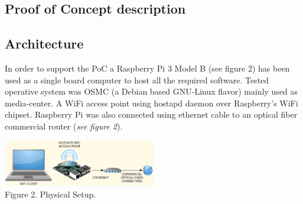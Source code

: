 \documentclass[12pt]{amsart}
\begin{document}
\begin{multicols}{2}

\section{Proof of Concept description}

\subsection{Architecture}
\label{ch:architecture}
\vspace{0.35cm}

In order to support the PoC a
Raspberry Pi 3 Model B (see figure 2) has been used
as a single board computer to host all the required software.
Tested operative system was OSMC\cite{osmc} (a Debian based
GNU-Linux flavor) mainly used as media-center.
A WiFi access point using
hostapd\cite{hostapd} daemon over Raspberry's WiFi chipset.
Raspberry Pi was also connected using ethernet cable
to an optical fiber commercial router (\textit{see figure 2}).

\begin{center}
  \includegraphics[keepaspectratio, width=0.5\textwidth]{images/physical-setup-y.eps}
\\
Figure 2. Physical Setup.
\\

\vspace{0.35cm}


\end{center}
\end{multicols}
\end{document}
